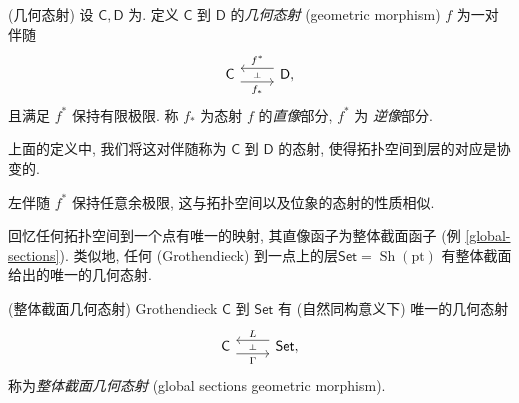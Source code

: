 \begin{definition}
    [label={geometric-morphism}]
    {(几何态射)}
    设 $\mathsf C,\mathsf D$ 为\topos{}.
    定义 $\mathsf C$ 到 $\mathsf D$ 的\emph{几何态射} (geometric morphism) $f$ 为一对伴随
    \[\begin{tikzcd}[ampersand replacement=\&]
    	{\mathsf C} \& {\mathsf D,}
    	\arrow[""{name=0, anchor=center, inner sep=0}, "{f_*}"', shift right=2, from=1-1, to=1-2]
    	\arrow[""{name=1, anchor=center, inner sep=0}, "{f^*}"', shift right=2, from=1-2, to=1-1]
    	\arrow["\dashv"{anchor=center, rotate=-90}, draw=none, from=1, to=0]
    \end{tikzcd}\]
    且满足 $f^*$ 保持有限极限.
    称 $f_*$ 为态射 $f$ 的\emph{直像}部分,
    $f^*$ 为 \emph{逆像}部分.
\end{definition}

\begin{remark}
    {}
    上面的定义中, 我们将这对伴随称为 $\mathsf C$ 到 $\mathsf D$ 的态射, 使得拓扑空间到层\topos{}的对应是协变的.

    左伴随 $f^*$ 保持任意余极限, 这与拓扑空间以及位象的态射的性质相似.
\end{remark}

回忆任何拓扑空间到一个点有唯一的映射, 其直像函子为整体截面函子 (例 \ref{global-sections}). 类似地, 任何 (Grothendieck) \topos{}到一点上的层\topos $\mathsf {Set}=\operatorname{Sh}(\text{pt})$ 有整体截面给出的唯一的几何态射.

\begin{propdef}
	[label={global-sections-geometric-morphism}]
    {(整体截面几何态射)}
    Grothendieck \topos{} $\mathsf C$ 到 $\mathsf {Set}$ 有 (自然同构意义下) 唯一的几何态射
    \[\begin{tikzcd}[ampersand replacement=\&]
    	{\mathsf C} \& {\mathsf {Set},}
    	\arrow[""{name=0, anchor=center, inner sep=0}, "L"', shift right=2, from=1-2, to=1-1]
    	\arrow[""{name=1, anchor=center, inner sep=0}, "\Gamma"', shift right=2, from=1-1, to=1-2]
    	\arrow["\dashv"{anchor=center, rotate=-90}, draw=none, from=0, to=1]
    \end{tikzcd}\]
    称为\emph{整体截面几何态射} (global sections geometric morphism). %
\end{propdef}

